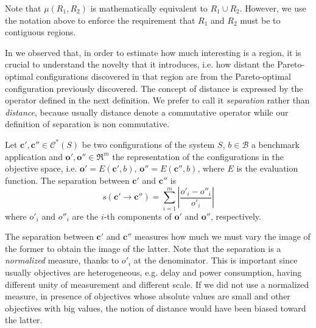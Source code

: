 Note that $\mu(R_{1},R_{2})$ is mathematically equivalent to $R_{1}\cup R_{2}$. However, we use the notation above to enforce the requirement that
$R_{1}$ and $R_{2}$ must be to contiguous regions.

In  we observed that, in order to estimate how much interesting is a region, it is crucial to understand the novelty that it introduces, i.e. how distant the Pareto-optimal configurations discovered in that region are from the Pareto-optimal configuration previously discovered. The concept of distance is expressed by the operator defined in the next definition. We prefer to call it \emph{separation} rather than \emph{distance}, because usually distance denote a commutative operator while our definition of separation is non commutative.

\begin{definition}[Separation]
Let $\mathbf{c}',\mathbf{c}''\in \mathcal{C}^*(S)$ be two configurations of the system $S$, $b\in\mathcal{B}$ a benchmark application and $\mathbf{o}',\mathbf{o}''\in \Re^m$ the representation of the configurations in the objective space, i.e. $\mathbf{o}'=E \left(\mathbf{c}', b\right)$, $\mathbf{o}''=E \left(\mathbf{c}'', b\right)$, where $E$ is the evaluation function. The separation between
$\mathbf{c}'$ and $\mathbf{c}''$ is 
	\[
	s\left(\mathbf{c}'\rightarrow\mathbf{c}''\right)=\sum_{i=1}^{m}\left|\frac{o'_{i}-o''_{i}}{o'_{i}}\right|
	\]
where $o'_i$ and $o''_i$ are the $i$-th components of $\mathbf{o}'$ and $\mathbf{o}''$, respectively.
\end{definition}

The separation between $\mathbf{c}'$ and $\mathbf{c}''$ measures how
much we must vary the image of the former to obtain the image of the latter. Note that the separation is a \emph{normalized} measure, thanks to $o'_i$ at the denominator. This is important since usually objectives are heterogeneous, e.g. delay and power consumption, having different unity of measurement and different scale. If we did not use a normalized measure, in presence of objectives whose absolute values are small and other objectives with big values, the notion of distance would have been biased toward the latter.
